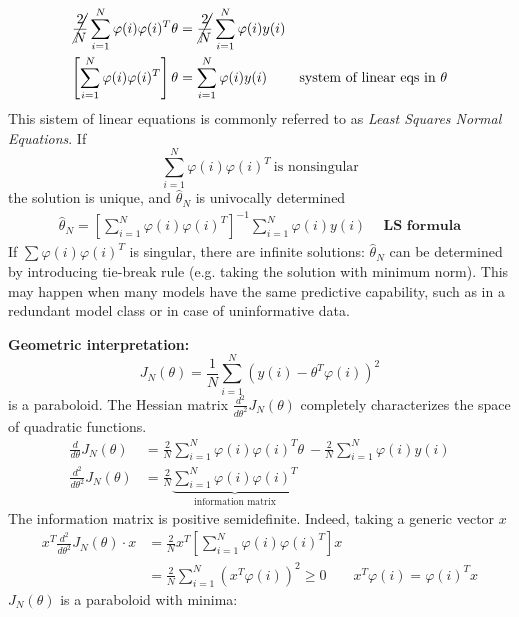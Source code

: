 \begin{equation*}
\begin{aligned}
\cancel{\frac{2}{N}}\sum _{i=1}^{N} \varphi ( i) \varphi ( i)^{T} \theta  & =\cancel{\frac{2}{N}}\sum _{i=1}^{N} \varphi ( i) y( i) & \\
\left[\sum _{i=1}^{N} \varphi ( i) \varphi ( i)^{T}\right] \theta  & =\sum _{i=1}^{N} \varphi ( i) y( i) & \text{system of linear eqs in} \ \theta 
\end{aligned}
\end{equation*}
This sistem of linear equations is commonly referred to as \textit{Least Squares Normal Equations}. If 
\begin{equation*}
\sum _{i=1}^{N} \varphi ( i) \varphi ( i)^{T} \ \text{is nonsingular}
\end{equation*}
the solution is unique, and $ \hat{\theta }_{N}$ is univocally determined
\begin{equation*}
\boxed{\begin{aligned}
\hat{\theta }_{N} =\left[\sum _{i=1}^{N} \varphi ( i) \varphi ( i)^{T}\right]^{-1}\sum _{i=1}^{N} \varphi ( i) y( i) & \ \ \mathbf{\text{LS formula}}
\end{aligned}}
\end{equation*}
If $ \sum \varphi ( i) \varphi ( i)^{T}$ is singular, there are infinite solutions: $ \hat{\theta }_{N}$ can be determined by introducing tie-break rule (e.g. taking the solution with minimum norm). This may happen when many models have the same predictive capability, such as in a redundant model class or in case of uninformative data.

\textbf{Geometric interpretation:}
\begin{equation*}
J_{N}( \theta ) =\frac{1}{N}\sum _{i=1}^{N}\left( y( i) -\theta ^{T} \varphi ( i)\right)^{2}
\end{equation*}
is a paraboloid. The Hessian matrix $ \frac{d^{2}}{d\theta ^{2}} J_{N}( \theta )$ completely characterizes the space of quadratic functions.
\begin{equation*}
\begin{aligned}
\frac{d}{d\theta } J_{N}( \theta ) & =\frac{2}{N}\sum _{i=1}^{N} \varphi ( i) \varphi ( i)^{T} \theta \ -\frac{2}{N}\sum _{i=1}^{N} \varphi ( i) y( i)\\
\frac{d^{2}}{d\theta ^{2}} J_{N}( \theta ) & =\frac{2}{N}\underbrace{\sum _{i=1}^{N} \varphi ( i) \varphi ( i)^{T}}_{\text{information matrix}}
\end{aligned}
\end{equation*}
The information matrix is positive semidefinite. Indeed, taking a generic vector $ x$
\begin{equation*}
\begin{aligned}
x^{T}\frac{d^{2}}{d\theta ^{2}} J_{N}( \theta ) \cdotp x & =\frac{2}{N} x^{T}\left[\sum _{i=1}^{N} \varphi ( i) \varphi ( i)^{T}\right] x & \\
 & =\frac{2}{N}\sum _{i=1}^{N}\left( x^{T} \varphi ( i)\right)^{2} \geq 0 & x^{T} \varphi ( i) =\varphi ( i)^{T} x
\end{aligned}
\end{equation*}
$ J_{N}( \theta )$ is a paraboloid with minima:

